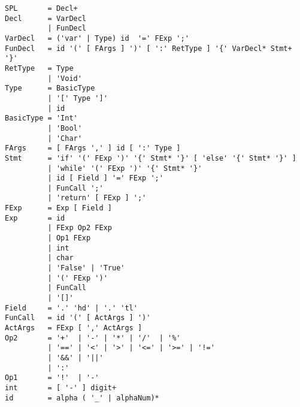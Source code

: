 \documentclass{report}
\begin{document}
\begin{verbatim}
SPL       = Decl+
Decl      = VarDecl
          | FunDecl
VarDecl   = ('var' | Type) id  '=' FExp ';'
FunDecl   = id '(' [ FArgs ] ')' [ ':' RetType ] '{' VarDecl* Stmt+ '}'
RetType   = Type
          | 'Void'
Type      = BasicType
          | '[' Type ']'
          | id
BasicType = 'Int'
          | 'Bool'
          | 'Char'
FArgs     = [ FArgs ',' ] id [ ':' Type ]
Stmt      = 'if' '(' FExp ')' '{' Stmt* '}' [ 'else' '{' Stmt* '}' ]
          | 'while' '(' FExp ')' '{' Stmt* '}'
          | id [ Field ] '=' FExp ';'
          | FunCall ';'
          | 'return' [ FExp ] ';'
FExp      = Exp [ Field ]
Exp       = id
          | FExp Op2 FExp
          | Op1 FExp
          | int
          | char
          | 'False' | 'True'
          | '(' FExp ')'
          | FunCall
          | '[]'
Field     = '.' 'hd' | '.' 'tl'
FunCall   = id '(' [ ActArgs ] ')'
ActArgs   = FExp [ ',' ActArgs ]
Op2       = '+'  | '-' | '*' | '/'  | '%'
          | '==' | '<' | '>' | '<=' | '>=' | '!='
          | '&&' | '||'
          | ':'
Op1       = '!'  | '-'
int       = [ '-' ] digit+
id        = alpha ( '_' | alphaNum)*
\end{verbatim}
\end{document}
